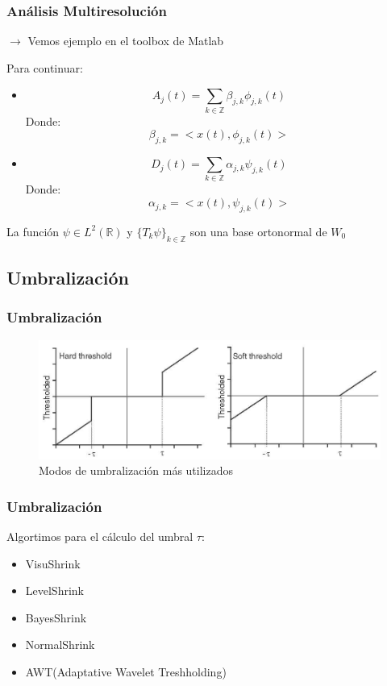 \documentclass{beamer}
\begin{document}
\begin{frame}
\frametitle{Análisis Multiresolución}
$\rightarrow$ Vemos ejemplo en el toolbox de Matlab
  
Para continuar:
\begin{itemize}
  \item 
  \begin{equation}
    A_j(t)=\sum_{k \in \mathbb Z} \beta _{j,k} \phi _{j,k}(t)
  \end{equation}
  Donde:
  \begin{equation}
    \label{Beta}
    \beta _{j,k}= <x(t), \phi _{j,k}(t)>
  \end{equation}

  \item
  \begin{equation}
    D_j(t)=\sum_{k \in \mathbb Z} \alpha _{j,k} \psi _{j,k}(t)
  \end{equation}
  Donde:
  \begin{equation}
    \label{Alfa}
    \alpha _{j,k}= <x(t), \psi _{j,k}(t)>
  \end{equation}
\end{itemize}
La función $\psi \in L^{2}(\mathbb{R})$ y $\{T_k \psi \}_{k \in \mathbb{Z}}$ son una base ortonormal de $W_0$
\end{frame}

\begin{frame}
\subsection{Umbralización}
\frametitle{Umbralización}
\centering
\begin{figure}[htb]
  \centering
  \includegraphics[scale=0.4]{imgs/Umbral}
  \caption{Modos de umbralización más utilizados}
  \label{}
\end{figure}
\end{frame}

\begin{frame}
  \frametitle{Umbralización}
Algortimos para el cálculo del umbral $\tau$:
\begin{itemize}
  \item VisuShrink
  \item LevelShrink
  \item BayesShrink
  \item NormalShrink
  \item AWT(Adaptative Wavelet Treshholding)
\end{itemize}
  

\end{frame}
\end{document}
